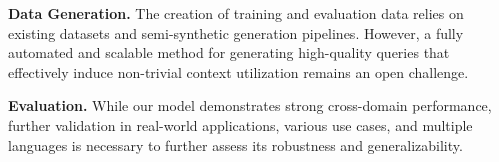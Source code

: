 

\noindent\textbf{Data Generation.} The creation of training and evaluation data relies on existing datasets and semi-synthetic generation pipelines. However, a fully automated and scalable method for generating high-quality queries that effectively induce non-trivial context utilization remains an open challenge.

\noindent\textbf{Evaluation.} While our model demonstrates strong cross-domain performance, further validation in real-world applications, various use cases, and multiple languages is necessary to further assess its robustness and generalizability.
